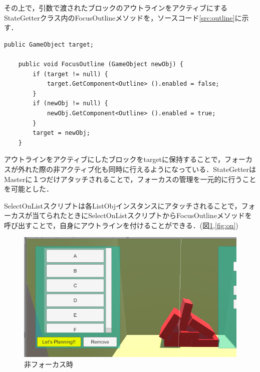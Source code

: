 \documentclass[12pt]{jarticle}
\begin{document}
その上で，引数で渡されたブロックのアウトラインをアクティブにするStateGetterクラス内のFocusOutlineメソッドを，ソースコード\ref{src:outline}に示す．

\begin{lstlisting}[caption=StateGetterクラス内のFocusOutlineメソッド, label=src:outline]
    public GameObject target;
    
    public void FocusOutline (GameObject newObj) {
        if (target != null) {
            target.GetComponent<Outline> ().enabled = false;
        }
        if (newObj != null) {
            newObj.GetComponent<Outline> ().enabled = true;
        }
        target = newObj;
    }
\end{lstlisting}

アウトラインをアクティブにしたブロックをtargetに保持することで，フォーカスが外れた際の非アクティブ化も同時に行えるようになっている．StateGetterはMasterに１つだけアタッチされることで，フォーカスの管理を一元的に行うことを可能とした．

SelectOnListスクリプトは各ListObjインスタンスにアタッチされることで，フォーカスが当てられたときにSelectOnListスクリプトからFocusOutlineメソッドを呼び出すことで，自身にアウトラインを付けることができる．(図\ref{fig:off},\ref{fig:on})

\begin{figure}[!hbt]
  \begin{center}
    \includegraphics[scale=0.5]{images/BWP_Work6/outline1.png}
  \end{center}
  \caption{非フォーカス時}
  \label{fig:off}
\end{figure}
\end{document}
